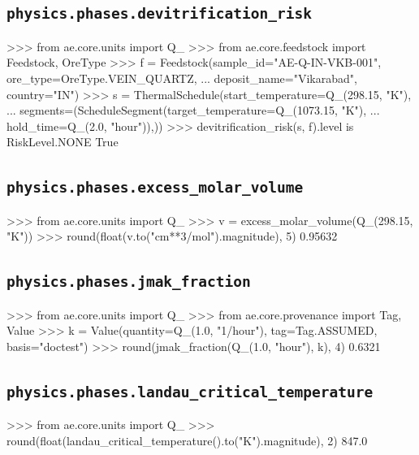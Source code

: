 \documentclass[10pt,a4paper,twoside]{report}
\begin{document}
\subsection*{\texttt{physics.phases.devitrification\_risk}}

\begin{doctestblock}
>>> from ae.core.units import Q_
>>> from ae.core.feedstock import Feedstock, OreType
>>> f = Feedstock(sample_id="AE-Q-IN-VKB-001", ore_type=OreType.VEIN_QUARTZ,
...               deposit_name="Vikarabad", country="IN")
>>> s = ThermalSchedule(start_temperature=Q_(298.15, "K"),
...                     segments=(ScheduleSegment(target_temperature=Q_(1073.15, "K"),
...                                               hold_time=Q_(2.0, "hour")),))
>>> devitrification_risk(s, f).level is RiskLevel.NONE
True
\end{doctestblock}

\subsection*{\texttt{physics.phases.excess\_molar\_volume}}

\begin{doctestblock}
>>> from ae.core.units import Q_
>>> v = excess_molar_volume(Q_(298.15, "K"))
>>> round(float(v.to("cm**3/mol").magnitude), 5)
0.95632
\end{doctestblock}

\subsection*{\texttt{physics.phases.jmak\_fraction}}

\begin{doctestblock}
>>> from ae.core.units import Q_
>>> from ae.core.provenance import Tag, Value
>>> k = Value(quantity=Q_(1.0, "1/hour"), tag=Tag.ASSUMED, basis="doctest")
>>> round(jmak_fraction(Q_(1.0, "hour"), k), 4)
0.6321
\end{doctestblock}

\subsection*{\texttt{physics.phases.landau\_critical\_temperature}}

\begin{doctestblock}
>>> from ae.core.units import Q_
>>> round(float(landau_critical_temperature().to("K").magnitude), 2)
847.0
\end{doctestblock}
\end{document}
